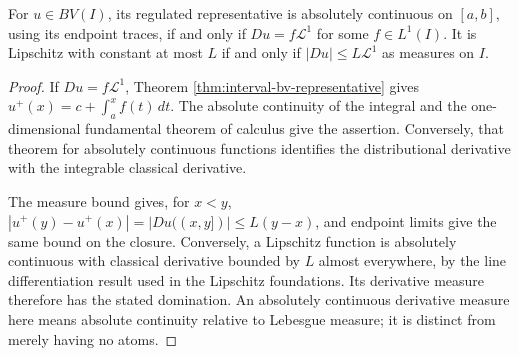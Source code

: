 \begin{proposition}\label{prop:interval-bv-ac-lipschitz}
For $u\in BV(I)$, its regulated representative is absolutely continuous on $[a,b]$, using its endpoint traces, if and only if $Du=f\mathcal L^1$ for some $f\in L^1(I)$. It is Lipschitz with constant at most $L$ if and only if $|Du|\leq L\mathcal L^1$ as measures on $I$.
\end{proposition}
\begin{proof}
If $Du=f\mathcal L^1$, Theorem \ref{thm:interval-bv-representative} gives $u^+(x)=c+\int_a^xf(t)\,dt$. The absolute continuity of the integral and the one-dimensional fundamental theorem of calculus give the assertion. Conversely, that theorem for absolutely continuous functions identifies the distributional derivative with the integrable classical derivative.

The measure bound gives, for $x<y$, $|u^+(y)-u^+(x)|=|Du((x,y])|\leq L(y-x)$, and endpoint limits give the same bound on the closure. Conversely, a Lipschitz function is absolutely continuous with classical derivative bounded by $L$ almost everywhere, by the line differentiation result used in the Lipschitz foundations. Its derivative measure therefore has the stated domination. An absolutely continuous derivative measure here means absolute continuity relative to Lebesgue measure; it is distinct from merely having no atoms.
\end{proof}

